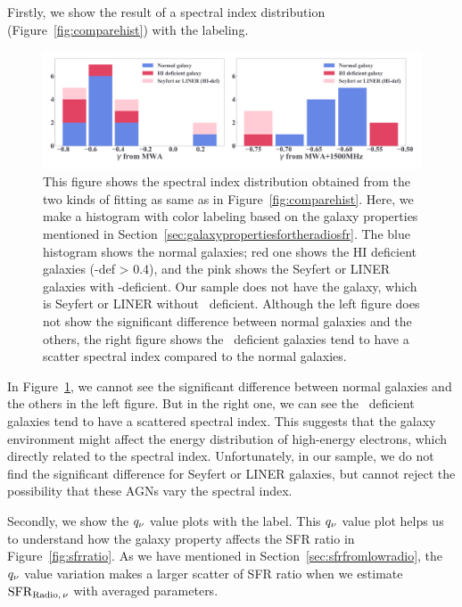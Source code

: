 Firstly, we show the result of a spectral index distribution (Figure~\ref{fig:comparehist}) with the labeling.

\begin{figure}[htbp]
	\centering
	\includegraphics[width=\linewidth]{Chapter_6/Figures/Discuss_comparehist.pdf}
    \caption[Histograms of $\gamma$ from the fitting (labeled)]{\label{fig:comparehist_h1def}
        This figure shows the spectral index distribution obtained from the two kinds of fitting as same as in Figure~\ref{fig:comparehist}.
        Here, we make a histogram with color labeling based on the galaxy properties mentioned in Section~\ref{sec:galaxypropertiesfortheradiosfr}.
        The blue histogram shows the normal galaxies; red one shows the HI deficient galaxies (\nh-def > 0.4), and the pink shows the Seyfert or LINER galaxies with \nh-deficient.
        Our sample does not have the galaxy, which is Seyfert or LINER without \nh~deficient.
        Although the left figure does not show the significant difference between normal galaxies and the others, the right figure shows the \nh~deficient galaxies tend to have a scatter spectral index compared to the normal galaxies.
    }
\end{figure}

In Figure~\ref{fig:comparehist_h1def}, we cannot see the significant difference between normal galaxies and the others in the left figure.
But in the right one, we can see the \nh~deficient galaxies tend to have a scattered spectral index.
This suggests that the galaxy environment might affect the energy distribution of high-energy electrons, which directly related to the spectral index.
Unfortunately, in our sample, we do not find the significant difference for Seyfert or LINER galaxies, but cannot reject the possibility that these AGNs vary the spectral index.

Secondly, we show the $q_{\nu}$ value plots with the label.
This $q_{\nu}$ value plot helps us to understand how the galaxy property affects the SFR ratio in Figure~\ref{fig:sfrratio}.
As we have mentioned in Section~\ref{sec:sfrfromlowradio}, the $q_{\nu}$ value variation makes a larger scatter of SFR ratio when we estimate $\mathrm{SFR}_{\mathrm{Radio},\,\nu}$ with averaged parameters.

